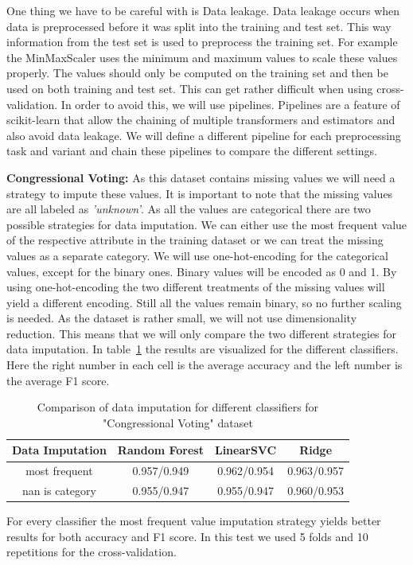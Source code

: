\documentclass[a4paper,10pt]{article}
\begin{document}
One thing we have to be careful with is Data leakage. Data leakage occurs when data is preprocessed before it was split into the training and test set. This way information 
from the test set is used to preprocess the training set. For example the MinMaxScaler uses the minimum and maximum values 
to scale these values properly. The values should only be computed on the training set and then be used on both training and 
test set. This can get rather difficult when using cross-validation. In order to avoid this, we will use pipelines.    
Pipelines are a feature of scikit-learn that allow the chaining of multiple transformers and estimators and also avoid 
data leakage. We will define a different pipeline for each preprocessing task and variant and chain these pipelines to compare 
the different settings.

\textbf{Congressional Voting:} As this dataset contains missing values we will need a strategy to impute these values. 
It is important to note that the missing values are all labeled as \textit{'unknown'}.
As all the values are categorical there are two possible strategies for data imputation.
We can either use the most frequent value of the respective attribute in the training dataset
or we can treat the missing values as a separate category. We will use one-hot-encoding for the categorical values,
except for the binary ones. Binary values will be encoded as 0 and 1. By using one-hot-encoding
the two different treatments of the missing values will yield a different encoding. Still all the values remain binary, 
so no further scaling is needed. As the dataset is rather small, we will not use dimensionality reduction. This means
that we will only compare the two different strategies for data imputation.
In table~\ref{table:imputation} the results are visualized for the different classifiers.
Here the right number in each cell is the average accuracy and the left number is the average F1 score.

\begin{table}[h!]
\centering
\begin{tabular}{|c|c|c|c|}
\hline
\textbf{Data Imputation} & \textbf{Random Forest} & \textbf{LinearSVC} & \textbf{Ridge} \\
\hline
\textsf{most frequent} & \cellcolor[HTML]{C1E1C1}0.957/0.949 & \cellcolor[HTML]{C1E1C1}0.962/0.954 & \cellcolor[HTML]{C1E1C1}0.963/0.957 \\
\hline
\textsf{nan is category} & 0.955/0.947 & 0.955/0.947 & 0.960/0.953 \\
\hline
\end{tabular}
\caption{Comparison of data imputation for different classifiers for "Congressional Voting" dataset}
\label{table:imputation}
\end{table}
For every classifier the most frequent value imputation strategy yields better results for both accuracy and F1 score.
In this test we used 5 folds and 10 repetitions for the cross-validation.
\end{document}
